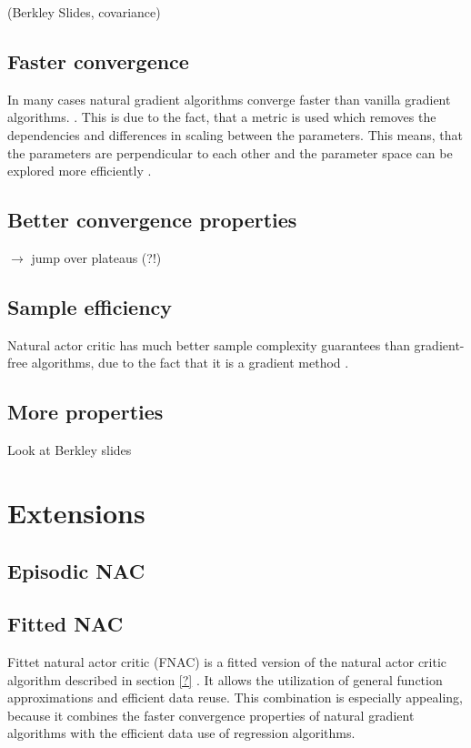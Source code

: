 (Berkley Slides, covariance)

\subsection{Faster convergence}
In many cases natural gradient algorithms converge faster than vanilla gradient algorithms. \cite{sohl2012natural, amari1998natural, ??}. This is due to the fact, that a metric is used which removes the dependencies and differences in scaling between the parameters. This means, that the parameters are perpendicular to each other and the parameter space can be explored more efficiently \cite{sohl2012natural}.

\subsection{Better convergence properties}
\cite{amari1998natural} $\rightarrow$ jump over plateaus (?!)

\subsection{Sample efficiency}

Natural actor critic has much better sample complexity guarantees than gradient-free algorithms, due to the fact that it is a gradient method \cite{nemirovski2005efficient}.

\subsection{More properties}

Look at Berkley slides

\newpage
\section{Extensions}

\subsection{Episodic NAC}

\subsection{Fitted NAC}

Fittet natural actor critic (FNAC) is a fitted version of the natural actor critic algorithm described in section \ref{?} \cite{melo2008fitted}.  It allows the utilization of general function approximations and efficient data reuse. This combination is especially appealing, because it combines the faster convergence properties of natural gradient algorithms with the efficient data use of regression algorithms.

